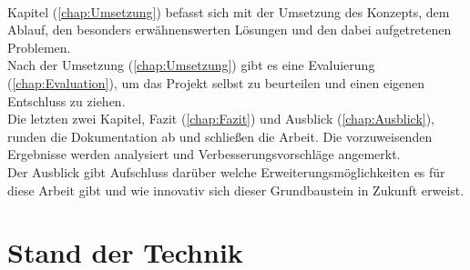 \\ 
\linebreak
Kapitel (\ref{chap:Umsetzung}) befasst sich mit der Umsetzung des Konzepts, dem Ablauf, den besonders erwähnenswerten Lösungen und den 
dabei aufgetretenen Problemen.
\\ 
\linebreak
Nach der Umsetzung (\ref{chap:Umsetzung}) gibt es eine Evaluierung (\ref{chap:Evaluation}), um das Projekt selbst zu beurteilen und einen 
eigenen Entschluss zu ziehen.
\\ 
\linebreak 
Die letzten zwei Kapitel, Fazit (\ref{chap:Fazit}) und Ausblick (\ref{chap:Ausblick}), runden die Dokumentation ab und schließen die 
Arbeit. Die vorzuweisenden Ergebnisse werden analysiert und Verbesserungsvorschläge angemerkt.
\\ 
Der Ausblick gibt Aufschluss darüber welche Erweiterungsmöglichkeiten es für diese Arbeit gibt und wie innovativ sich dieser 
Grundbaustein in Zukunft erweist. 
\pagebreak

\section{Stand der Technik}
\label{chap:Stand der Technik}